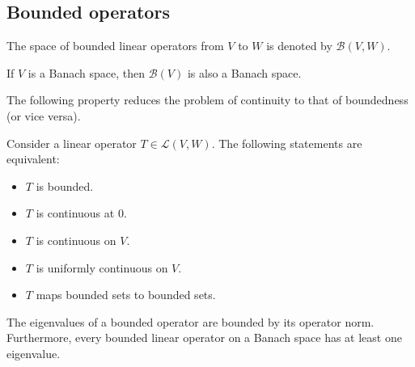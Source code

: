 
\subsection{Bounded operators}

    \begin{notation}
        The space of bounded linear operators from $V$ to $W$ is denoted by $\mathcal{B}(V,W)$.
    \end{notation}
    \begin{property}
        If $V$ is a Banach space, then $\mathcal{B}(V)$ is also a Banach space.
    \end{property}

    The following property reduces the problem of continuity to that of boundedness (or vice versa).
    \begin{property}\label{functional:bounded_continuous}
        Consider a linear operator $T\in\mathcal{L}(V, W)$. The following statements are equivalent:
        \begin{itemize}
            \item $T$ is bounded.
            \item $T$ is continuous at 0.
            \item $T$ is continuous on $V$.
            \item $T$ is uniformly continuous on $V$.
            \item $T$ maps bounded sets to bounded sets.
        \end{itemize}
    \end{property}

    \begin{property}
        The eigenvalues of a bounded operator are bounded by its operator norm. Furthermore, every bounded linear operator on a Banach space has at least one eigenvalue.
    \end{property}

